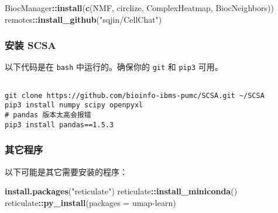 \documentclass[
]{article}
\newenvironment{Shaded}{\begin{snugshade}}{\end{snugshade}}
\newcommand{\DataTypeTok}[1]{\textcolor[rgb]{0.13,0.29,0.53}{#1}}
\newcommand{\KeywordTok}[1]{\textcolor[rgb]{0.13,0.29,0.53}{\textbf{#1}}}
\newcommand{\NormalTok}[1]{#1}
\newcommand{\OperatorTok}[1]{\textcolor[rgb]{0.81,0.36,0.00}{\textbf{#1}}}
\newcommand{\StringTok}[1]{\textcolor[rgb]{0.31,0.60,0.02}{#1}}
\begin{document}
\begin{Shaded}
\begin{Highlighting}[]
\NormalTok{BiocManager}\OperatorTok{::}\KeywordTok{install}\NormalTok{(}\KeywordTok{c}\NormalTok{(}\StringTok{\textquotesingle{}NMF\textquotesingle{}}\NormalTok{, }\StringTok{\textquotesingle{}circlize\textquotesingle{}}\NormalTok{, }\StringTok{\textquotesingle{}ComplexHeatmap\textquotesingle{}}\NormalTok{, }\StringTok{\textquotesingle{}BiocNeighbors\textquotesingle{}}\NormalTok{))}
\NormalTok{remotes}\OperatorTok{::}\KeywordTok{install\_github}\NormalTok{(}\StringTok{"sqjin/CellChat"}\NormalTok{)}
\end{Highlighting}
\end{Shaded}

\hypertarget{ux5b89ux88c5-scsa}{%
\subsubsection{安装 SCSA}\label{ux5b89ux88c5-scsa}}

以下代码是在 \texttt{bash} 中运行的。确保你的 \texttt{git} 和 \texttt{pip3} 可用。

\begin{tcolorbox}[colback = gray!10, colframe = red!50, width = 16cm, arc = 1mm, auto outer arc, title = {Bash input}]
\begin{verbatim}

git clone https://github.com/bioinfo-ibms-pumc/SCSA.git ~/SCSA
pip3 install numpy scipy openpyxl
# pandas 版本太高会报错
pip3 install pandas==1.5.3

\end{verbatim}
\end{tcolorbox}

\hypertarget{installOthers}{%
\subsubsection{其它程序}\label{installOthers}}

以下可能是其它需要安装的程序：

\begin{Shaded}
\begin{Highlighting}[]
\KeywordTok{install.packages}\NormalTok{(}\StringTok{"reticulate"}\NormalTok{)}
\NormalTok{reticulate}\OperatorTok{::}\KeywordTok{install\_miniconda}\NormalTok{()}
\NormalTok{reticulate}\OperatorTok{::}\KeywordTok{py\_install}\NormalTok{(}\DataTypeTok{packages =} \StringTok{\textquotesingle{}umap{-}learn\textquotesingle{}}\NormalTok{)}
\end{Highlighting}
\end{Shaded}
\end{document}
